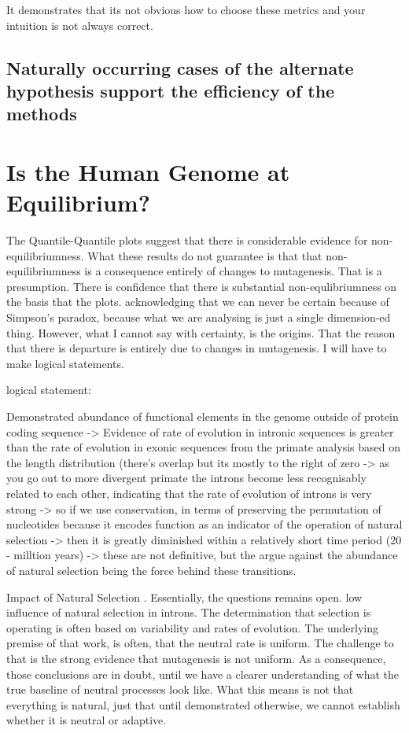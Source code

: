 It demonstrates that its not obvious how to choose these metrics and your intuition is not always correct. 


\subsection*{Naturally occurring cases of the alternate hypothesis support the efficiency of the methods}


\section{Is the Human Genome at Equilibrium?}



The Quantile-Quantile plots suggest that there is considerable evidence for non-equilibriumness. What these results do not guarantee is that that non-equilibriumness is a consequence entirely of changes to mutagenesis. That is a presumption. There is confidence that there is substantial non-equlibriumness on the basis that the plots. acknowledging that we can never be certain because of Simpson's paradox, because what we are analysing is just a single dimension-ed thing. However, what I cannot say with certainty, is the origins. That the reason that there is departure is entirely due to changes in mutagenesis. I will have to make logical statements. 

logical statement: 

Demonstrated abundance of functional elements in the genome outside of protein coding sequence -> Evidence of rate of evolution in intronic sequences is greater than the rate of evolution in exonic sequences from the primate analysis based on the length distribution (there's overlap but its mostly to the right of zero -> as you go out to more divergent primate the introns become less recognisably related to each other, indicating that the rate of evolution of introns is very strong -> so if we use conservation, in terms of preserving the permutation of nucleotides because it encodes function as an indicator of the operation of natural selection -> then it is greatly diminished within a relatively short time period (20 - milltion years) -> these are not definitive, but the argue against the abundance of natural selection being the force behind these transitions.

Impact of Natural Selection \cite{Graur2013OnENCODE}. Essentially, the questions remains open. 
low influence of natural selection in introns. 
The determination that selection is operating is often based on variability and rates of evolution. The underlying premise of that work, is often, that the neutral rate is uniform. The challenge to that is the strong evidence that mutagenesis is not uniform. As a consequence, those conclusions are in doubt, until we have a clearer understanding of what the true baseline of neutral processes look like. What this means is not that everything is natural, just that until demonstrated otherwise, we cannot establish whether it is neutral or adaptive. 

